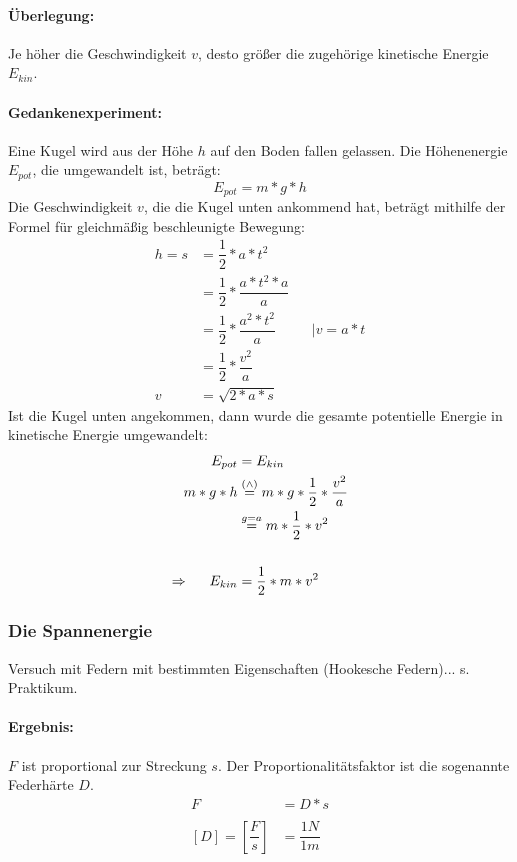 \documentclass[12pt]{article}
\numberwithin{equation}{subsection}
\begin{document}
	\paragraph{Überlegung:}
	Je höher die Geschwindigkeit $ v $, desto größer die zugehörige kinetische Energie $ E_{kin} $.
	\paragraph{Gedankenexperiment:} Eine Kugel wird aus der Höhe $ h $ auf den Boden fallen gelassen. Die Höhenenergie $ E_{pot} $, die umgewandelt ist, beträgt:
	\begin{equation}
		E_{pot} = m*g*h
	\end{equation}
	Die Geschwindigkeit $ v $, die die Kugel unten ankommend hat, beträgt mithilfe der Formel für gleichmäßig beschleunigte Bewegung:
	\begin{align}
		h = s &= \dfrac{1}{2}*a*t^2\\
		&= \dfrac{1}{2}*\dfrac{a*t^2*a}{a}\\
		&= \dfrac{1}{2}*\dfrac{a^2*t^2}{a} && |v=a*t\\
		&= \dfrac{1}{2}*\dfrac{v^2}{a}\\
		v &= \sqrt{2*a*s}
	\end{align}
	Ist die Kugel unten angekommen, dann wurde die gesamte potentielle Energie in kinetische Energie umgewandelt:
	\begin{align}
		E_{pot} &= E_{kin}\\
		m*g*h &\stackrel{(\wedge)}{=} m*g*\dfrac{1}{2}*\dfrac{v^2}{a}\\
		&\stackrel{g=a}{=} m*\dfrac{1}{2}*v^2\\
		\nonumber\\
		\Rightarrow\hspace{0.5cm} E_{kin} &= \dfrac{1}{2}*m*v^2
	\end{align}
	
	\subsubsection{Die Spannenergie}
	Versuch mit Federn mit bestimmten Eigenschaften (Hookesche Federn)... s. Praktikum.
	\paragraph{Ergebnis:}
	$ F $ ist proportional zur Streckung $ s $. Der Proportionalitätsfaktor ist die sogenannte Federhärte $ D $.
	\begin{align}
		F &= D*s\\
		\nonumber\\
		[D] = \left[\dfrac{F}{s}\right] &= \dfrac{1N}{1m}
	\end{align}
\end{document}
